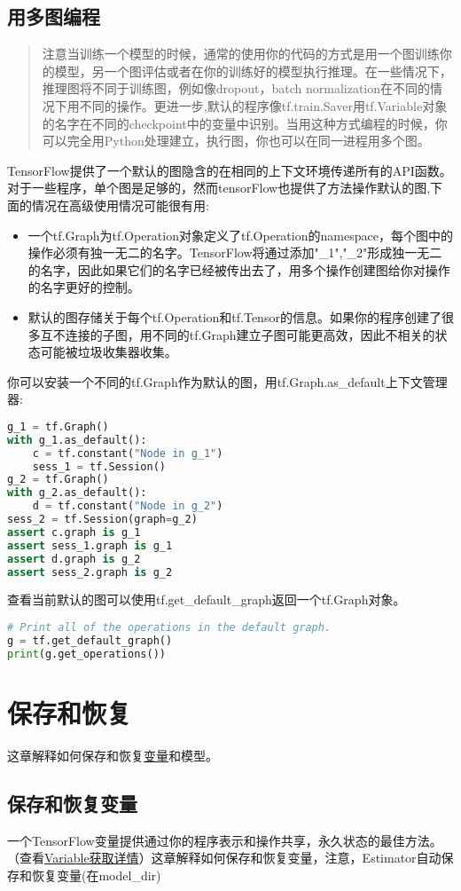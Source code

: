 \subsection{用多图编程}
\begin{quote}
注意当训练一个模型的时候，通常的使用你的代码的方式是用一个图训练你的模型，另一个图评估或者在你的训练好的模型执行推理。在一些情况下，推理图将不同于训练图，例如像dropout，batch normalization在不同的情况下用不同的操作。更进一步,默认的程序像tf.train.Saver用tf.Variable对象的名字在不同的checkpoint中的变量中识别。当用这种方式编程的时候，你可以完全用Python处理建立，执行图，你也可以在同一进程用多个图。
\end{quote}
TensorFlow提供了一个默认的图隐含的在相同的上下文环境传递所有的API函数。对于一些程序，单个图是足够的，然而tensorFlow也提供了方法操作默认的图,下面的情况在高级使用情况可能很有用:
\begin{itemize}
	\item 一个tf.Graph为tf.Operation对象定义了tf.Operation的namespace，每个图中的操作必须有独一无二的名字。TensorFlow将通过添加"\_1","\_2"形成独一无二的名字，因此如果它们的名字已经被传出去了，用多个操作创建图给你对操作的名字更好的控制。
	\item 默认的图存储关于每个tf.Operation和tf.Tensor的信息。如果你的程序创建了很多互不连接的子图，用不同的tf.Graph建立子图可能更高效，因此不相关的状态可能被垃圾收集器收集。
\end{itemize}
你可以安装一个不同的tf.Graph作为默认的图，用tf.Graph.as\_default上下文管理器:
\begin{lstlisting}[language=Python]
g_1 = tf.Graph()
with g_1.as_default():
    c = tf.constant("Node in g_1")
    sess_1 = tf.Session()
g_2 = tf.Graph()
with g_2.as_default():
    d = tf.constant("Node in g_2")
sess_2 = tf.Session(graph=g_2)
assert c.graph is g_1
assert sess_1.graph is g_1
assert d.graph is g_2
assert sess_2.graph is g_2
\end{lstlisting}
查看当前默认的图可以使用tf.get\_default\_graph返回一个tf.Graph对象。
\begin{lstlisting}[language=Python]
# Print all of the operations in the default graph.
g = tf.get_default_graph()
print(g.get_operations())
\end{lstlisting}
\section{保存和恢复}
这章解释如何保存和恢复\href{https://www.tensorflow.org/programmers_guide/variables?hl=zh-cn}{变量}和模型。
\subsection{保存和恢复变量}
一个TensorFlow变量提供通过你的程序表示和操作共享，永久状态的最佳方法。（查看\href{https://www.tensorflow.org/programmers_guide/variables?hl=zh-cn}{Variable获取详情}）这章解释如何保存和恢复变量，注意，Estimator自动保存和恢复变量(在model\_dir)

